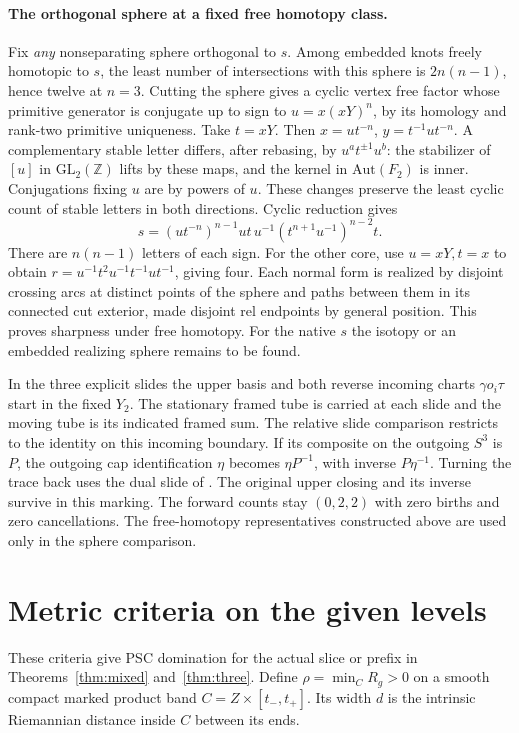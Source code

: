 \documentclass[11pt,letterpaper]{article}
\numberwithin{equation}{section}
\theoremstyle{remark}
\begin{document}
\paragraph{The orthogonal sphere at a fixed free homotopy class.}
Fix \emph{any} nonseparating sphere orthogonal to \(s\). Among
embedded knots freely homotopic to \(s\), the least number of
intersections with this sphere is \(2n(n-1)\), hence twelve at \(n=3\). Cutting the sphere gives a cyclic vertex free factor
whose primitive generator is conjugate up to sign to \(u=x(xY)^n\),
by its homology and rank-two primitive uniqueness. Take \(t=xY\).
Then \(x=ut^{-n}\), \(y=t^{-1}ut^{-n}\). A complementary stable
letter differs, after rebasing, by \(u^a t^{\pm1}u^b\): the
stabilizer of \([u]\) in \(\mathrm{GL}_2(\mathbb Z)\) lifts by these
maps, and the kernel in \(\mathrm{Aut}(F_2)\) is inner. Conjugations
fixing \(u\) are by powers of \(u\). These changes preserve the least
cyclic count of stable letters in both directions. Cyclic reduction gives
\[
 s=(ut^{-n})^{n-1}ut\,u^{-1}(t^{n+1}u^{-1})^{n-2}t .
\]
There are \(n(n-1)\) letters of each sign. For the other core, use
\(u=xY,t=x\) to obtain \(r=u^{-1}t^2u^{-1}t^{-1}ut^{-1}\), giving
four. Each normal form is realized by disjoint crossing arcs at
distinct points of the sphere and paths between them in its connected
cut exterior, made disjoint rel endpoints by general position.
This proves sharpness under free homotopy. For the native \(s\) the
isotopy or an embedded realizing sphere remains to be found.

In the three explicit slides the upper basis and both reverse
incoming charts \(\gamma o_i\tau\) start in the fixed \(Y_2\).
The stationary framed tube is carried at each slide and the moving
tube is its indicated framed sum. The relative slide comparison
restricts to the identity on this incoming boundary. If its composite
on the outgoing \(S^3\) is \(P\), the outgoing cap identification
\(\eta\) becomes \(\eta P^{-1}\), with inverse \(P\eta^{-1}\).
Turning the trace back uses the dual slide of
\cite[Lemma 2.1]{GompfScharlemannThompson2010}. The original upper
closing and its inverse survive in this marking. The forward counts
stay \((0,2,2)\) with zero births and zero cancellations. The
free-homotopy representatives constructed above are used only in the
sphere comparison.

\section{Metric criteria on the given levels}\label{sec:bands}
These criteria give PSC domination for the actual slice
or prefix in Theorems~\ref{thm:mixed} and~\ref{thm:three}.
Define \(\rho=\min_C R_g>0\) on a smooth compact marked
product band \(C=Z\times[t_-,t_+]\). Its width \(d\) is
the intrinsic Riemannian distance inside \(C\) between its ends.
\end{document}

